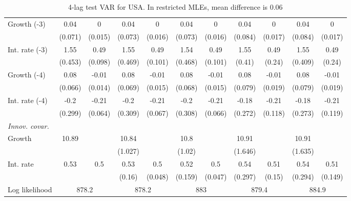 \begin{table}[htbp]
\begin{tabular}{@{\extracolsep{4pt}}lcccccccccc@{}}
\quad Growth (-3) 	 &0.04 	 & 0 	 & 0.04 	 & 0 	 & 0.04 	 & 0 	 & 0.04 	 & 0 	 & 0.04 	 & 0	 \\ 
 		 & (0.071) 	 & (0.015) 	 & (0.073) 	 & (0.016) 	 & (0.073) 	 & (0.016) 	 & (0.084) 	 & (0.017) 	 & (0.084) 	 & (0.017) 	 \\ 
\quad Int. rate (-3) 	 &1.55 	 & 0.49 	 & 1.55 	 & 0.49 	 & 1.54 	 & 0.49 	 & 1.55 	 & 0.49 	 & 1.55 	 & 0.49	 \\ 
 		 & (0.453) 	 & (0.098) 	 & (0.469) 	 & (0.101) 	 & (0.468) 	 & (0.101) 	 & (0.41) 	 & (0.24) 	 & (0.409) 	 & (0.24) 	 \\ 
\quad Growth (-4) 	 &0.08 	 & -0.01 	 & 0.08 	 & -0.01 	 & 0.08 	 & -0.01 	 & 0.08 	 & -0.01 	 & 0.08 	 & -0.01	 \\ 
 		 & (0.066) 	 & (0.014) 	 & (0.069) 	 & (0.015) 	 & (0.068) 	 & (0.015) 	 & (0.079) 	 & (0.019) 	 & (0.079) 	 & (0.019) 	 \\ 
\quad Int. rate (-4) 	 &-0.2 	 & -0.21 	 & -0.2 	 & -0.21 	 & -0.2 	 & -0.21 	 & -0.18 	 & -0.21 	 & -0.18 	 & -0.21	 \\ 
 		 & (0.299) 	 & (0.064) 	 & (0.309) 	 & (0.067) 	 & (0.308) 	 & (0.066) 	 & (0.272) 	 & (0.118) 	 & (0.273) 	 & (0.119) 	 \\ 
\rule{0pt}{4ex} \emph{Innov. covar.}  	 & 	 & 	 & 	 & 	 & 	 & 	 & 	 & 	 & 	 &\\ 
\quad Growth 	 &10.89 	 &  	 & 10.84 	 &  	 & 10.8 	 &  	 & 10.91 	 &  	 & 10.91 	 & 	 \\ 
 		 &  	 &  	 & (1.027) 	 &  	 & (1.02) 	 &  	 & (1.646) 	 &  	 & (1.635) 	 &  	 \\ 
\quad Int. rate 	 &0.53 	 & 0.5 	 & 0.53 	 & 0.5 	 & 0.52 	 & 0.5 	 & 0.54 	 & 0.51 	 & 0.54 	 & 0.51	 \\ 
 		 &  	 &  	 & (0.16) 	 & (0.048) 	 & (0.159) 	 & (0.047) 	 & (0.297) 	 & (0.15) 	 & (0.294) 	 & (0.149) 	 \\ 
 \hline \rule{0pt}{4ex} 
  Log likelihood 	 &\multicolumn{2}{c}{878.2} 	 & \multicolumn{2}{c}{878.2} 	 & \multicolumn{2}{c}{883} 	 & \multicolumn{2}{c}{879.4} 	 & \multicolumn{2}{c}{884.9}\\ 

 \hline 	\end{tabular}		\caption{4-lag test VAR for USA. In restricted MLEs, mean difference is 0.06}
		\label{tab:USA4lag}

\end{table}